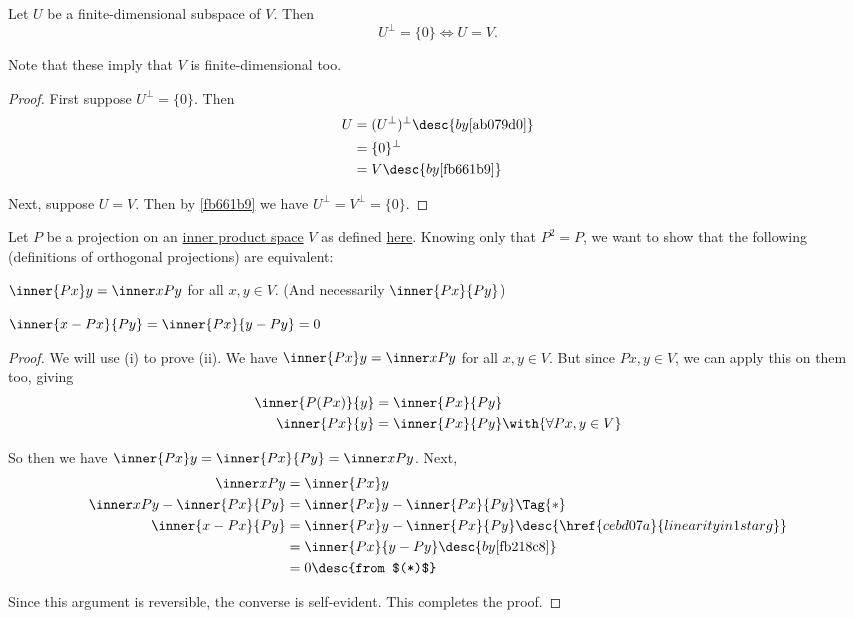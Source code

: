 \label{f8b7711}

Let $U$ be a finite-dimensional subspace of $V$. Then
$$
  U^\perp=\{0\}\iff U=V.
$$

Note that these imply that $V$ is finite-dimensional too.

\begin{proof}
  First suppose $U^\perp=\{0\}$. Then
  \begin{align*}
    U &=(U^\perp)^\perp\desc{by \autoref{ab079d0}} \\
      &=\{0\}^\perp                                \\
      &=V\desc{by \autoref{fb661b9}}
  \end{align*}

  Next, suppose $U=V$. Then by \autoref{fb661b9} we have
  $U^\perp=V^\perp=\{0\}$.
\end{proof}

\label{a0d3151}

Let $P$ be a projection on an \href{b9935c8}{inner product space} $V$ as
defined \href{fb705a2}{here}. Knowing only that $P^2=P$, we want to show that
the following (definitions of orthogonal projections) are equivalent:
\begin{enumerati}
  \item $\inner{Px}y=\inner x{Py}$ for all $x,y\in V$. (And necessarily
  $\inner{Px}{Py}$)
  \item $\inner{x-Px}{Py}=\inner{Px}{y-Py}=0$
\end{enumerati}

\begin{proof}
  We will use (i) to prove (ii). We have $\inner{Px}y=\inner x{Py}$ for all
  $x,y\in V$. But since $Px,y\in V$, we can apply this on them too, giving
  \begin{align*}
    \inner{P(Px)}{y} &=\inner{Px}{Py}                         \\
    \inner{Px}{y}    &=\inner{Px}{Py}\with{\forall Px,y\in V}
  \end{align*}

  So then we have $\inner{Px}y=\inner{Px}{Py}=\inner x{Py}$. Next,
  \begin{align*}
    \inner x{Py}                &=\inner{Px}y                                                           \\
    \inner x{Py}-\inner{Px}{Py} &=\inner{Px}y-\inner{Px}{Py}\Tag{*}                                     \\
    \inner{x-Px}{Py}            &=\inner{Px}y-\inner{Px}{Py}\desc{\href{cebd07a}{linearity in 1st arg}} \\
                                &=\inner{Px}{y-Py}\desc{by \autoref{fb218c8}}                           \\
                                &=0\desc{from $(*)$}
  \end{align*}

  Since this argument is reversible, the converse is self-evident. This
  completes the proof.
\end{proof}

